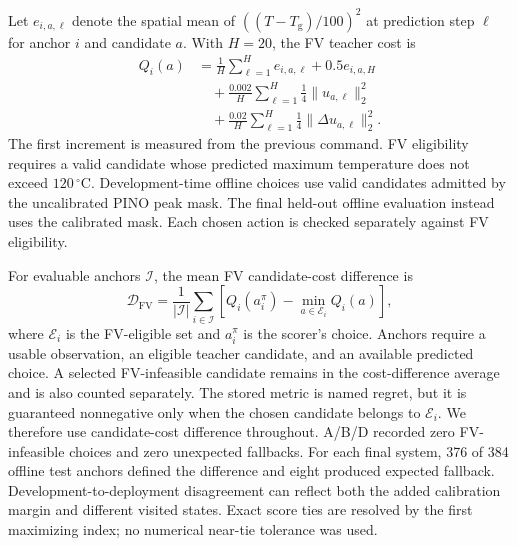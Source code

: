 

Let $e_{i,a,\ell}$ denote the spatial mean of $((T-T_{\mathrm g})/100)^2$ at prediction step $\ell$ for anchor $i$ and candidate $a$. With $H=20$, the FV teacher cost is
\begin{equation}
\begin{aligned}
Q_i(a)&=\frac{1}{H}\sum_{\ell=1}^{H}e_{i,a,\ell}
       +0.5e_{i,a,H}\\
&\quad+\frac{0.002}{H}\sum_{\ell=1}^{H}
                  \frac{1}{4}\|u_{a,\ell}\|_2^2\\
&\quad+\frac{0.02}{H}\sum_{\ell=1}^{H}
                  \frac{1}{4}\|\Delta u_{a,\ell}\|_2^2.
\end{aligned}
\label{eq:teacher}
\end{equation}
The first increment is measured from the previous command. FV eligibility requires a valid candidate whose predicted maximum temperature does not exceed $120\,^{\circ}$C. Development-time offline choices use valid candidates admitted by the uncalibrated PINO peak mask. The final held-out offline evaluation instead uses the calibrated mask. Each chosen action is checked separately against FV eligibility.

For evaluable anchors $\mathcal I$, the mean FV candidate-cost difference is
\begin{equation}
\mathcal D_{\mathrm{FV}}=\frac{1}{|\mathcal I|}
\sum_{i\in\mathcal I}
\left[Q_i(a_i^\pi)-\min_{a\in\mathcal E_i}Q_i(a)\right],
\label{eq:regret}
\end{equation}
where $\mathcal E_i$ is the FV-eligible set and $a_i^\pi$ is the scorer's choice. Anchors require a usable observation, an eligible teacher candidate, and an available predicted choice. A selected FV-infeasible candidate remains in the cost-difference average and is also counted separately. The stored metric is named regret, but it is guaranteed nonnegative only when the chosen candidate belongs to $\mathcal E_i$. We therefore use candidate-cost difference throughout. A/B/D recorded zero FV-infeasible choices and zero unexpected fallbacks. For each final system, 376 of 384 offline test anchors defined the difference and eight produced expected fallback. Development-to-deployment disagreement can reflect both the added calibration margin and different visited states. Exact score ties are resolved by the first maximizing index; no numerical near-tie tolerance was used.

